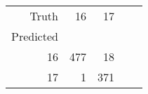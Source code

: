 \begin{tabular}{rrrrr}
\toprule
Truth & 16 & 17 \\
Predicted &  &  \\
\midrule
16 & 477 & 18 \\
17 & 1 & 371 \\
\bottomrule
\end{tabular}
